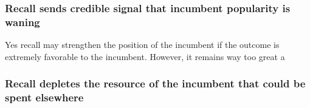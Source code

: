\documentclass[hyphens, crop=false]{standalone}
\begin{document}
		\subsubsection*{Recall sends credible signal that incumbent popularity is waning}
		
		Yes recall may strengthen the position of the incumbent if the outcome is extremely
		favorable to the incumbent.
		However, it remains way too great a 
		
		
		\subsubsection*{Recall depletes the resource of the incumbent that could be spent elsewhere}
%		
%		
%		
%		
%		
%		
%		
%		
%		
		
\end{document}
